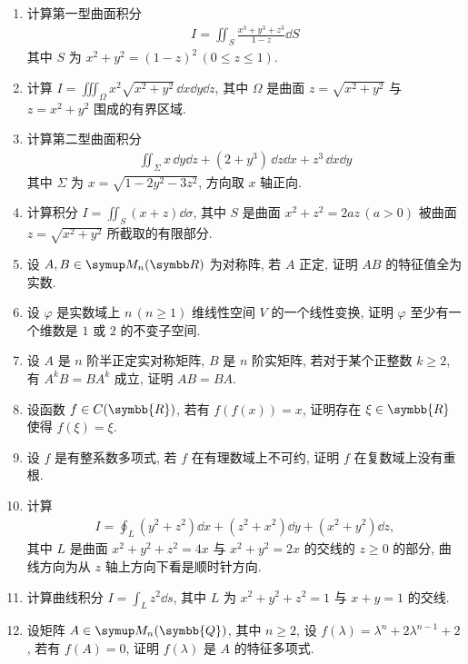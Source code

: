 \documentclass{ctexart}
\let\ge\geqslant
\let\le\leqslant
\newcommand{\R}{\ensuremath{\symbb{R}}}
\newcommand{\Q}{\ensuremath{\symbb{Q}}}
\begin{document}
\begin{enumerate}[resume=exer]
        \item 计算第一型曲面积分
        \begin{align*}
            I = \iint_{S} \frac{x^{3} + y^{3} + z^{3}}{1-z} \dd{S}
        \end{align*}
        其中 $ S $ 为 $ x^{2} + y^{2} = (1-z)^{2}\,(0 \le z \le 1) $. 
        \item 计算 $ I = \iiint_{\Omega} x^{2}\sqrt{x^{2} + y^{2}}\,\dd x\dd y\dd z $, 其中 $ \Omega $ 是曲面 $ z = \sqrt{x^{2} + y^{2}} $ 与 $ z = x^{2} + y^{2} $ 围成的有界区域.
        \item 计算第二型曲面积分
        \begin{align*}
            \iint_{\Sigma} x\,\dd y\dd z + (2 + y^{3})\,\dd z\dd x + z^{3}\,\dd x\dd y
        \end{align*}
        其中 $ \Sigma $ 为 $ x = \sqrt{1 - 2y^{2} - 3z^{2}} $, 方向取 $ x $ 轴正向.
        \item 计算积分 $ I = \iint_{S} (x + z) \dd{\sigma} $, 其中 $ S $ 是曲面 $ x^{2} + z^{2} = 2az\,(a > 0) $ 被曲面 $ z = \sqrt{x^{2} + y^{2}} $ 所截取的有限部分.
        \item 设 $ A, B \in \MM $ 为对称阵, 若 $ A $ 正定, 证明 $ AB $ 的特征值全为实数.
        \item 设 $ \varphi $ 是实数域上 $ n\,(n\ge 1) $ 维线性空间 $ V $ 的一个线性变换, 证明 $ \varphi $ 至少有一个维数是 $ 1 $ 或 $ 2 $ 的不变子空间.
        \item 设 $ A $ 是 $ n $ 阶半正定实对称矩阵, $ B $ 是 $ n $ 阶实矩阵, 若对于某个正整数 $ k \ge 2 $, 有 $ A^{k}B = BA^{k} $ 成立, 证明 $ AB = BA $. 
        \item 设函数 $ f \in C(\R) $, 若有 $ f(f(x)) = x $, 证明存在 $ \xi\in \R $ 使得 $ f(\xi) = \xi $.
        \item 设 $ f $ 是有整系数多项式, 若 $ f $ 在有理数域上不可约, 证明 $ f $ 在复数域上没有重根. 
        \item 计算 
        \begin{align*}
            I = \oint_{L} (y^{2} + z^{2}) \dd{x} + (z^{2} + x^{2}) \dd{y} + (x^{2} + y^{2}) \dd{z},
        \end{align*}
        其中 $ L $ 是曲面 $ x^{2} + y^{2} + z^{2} = 4x $ 与 $ x^{2} + y^{2} = 2x $ 的交线的 $ z \ge 0 $ 的部分, 曲线方向为从 $ z $ 轴上方向下看是顺时针方向.
        \item 计算曲线积分 $ I = \int_{L} z^{2} \dd{s} $, 其中 $ L $ 为 $ x^{2} + y^{2} + z^{2} = 1 $ 与 $ x + y = 1 $ 的交线.
        \item 设矩阵 $ A \in \MM[\Q] $, 其中 $ n\ge 2 $, 设 $ f(\lambda) = \lambda^{n} + 2\lambda^{n-1} + 2 $, 若有 $ f(A) = 0 $, 证明 $ f(\lambda) $ 是 $ A $ 的特征多项式.

\end{enumerate}
\end{document}

